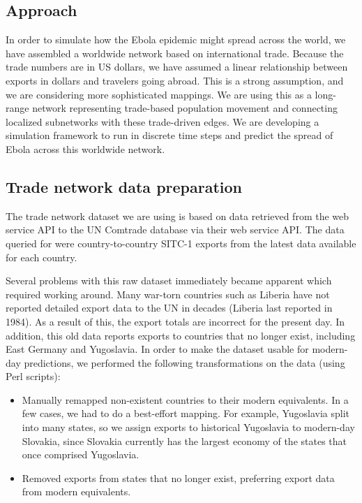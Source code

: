 \documentclass[10pt, journal,onecolumn]{IEEEtran}
\begin{document}
\subsection*{\textbf{Approach}}
In order to simulate how the Ebola epidemic might spread across the world, we have assembled a
worldwide network based on international trade. Because the trade numbers are in US dollars,
we have assumed a linear relationship between exports in dollars and travelers going abroad.
This is a strong assumption, and we are considering more sophisticated mappings.
We are using this as a long-range network representing trade-based population movement and
connecting localized subnetworks with these trade-driven edges. We are developing a simulation
framework to run in discrete time steps and predict the spread of Ebola across this worldwide network.

\subsection*{\textbf{Trade network data preparation}}

The trade network dataset we are using is based on data retrieved from the web service API to the
UN Comtrade database \citep{uncomtradedata} via their web service API.
The data queried for were country-to-country SITC-1 exports from the latest data available
for each country.

Several problems with this raw dataset immediately became apparent which required working around.
Many war-torn countries such as Liberia have not reported detailed export data
to the UN in decades (Liberia last reported in 1984). As a result of this, the export totals
are incorrect for the present day. In addition, this old data reports exports to countries that
no longer exist, including East Germany and Yugoslavia. In order to make the dataset usable for
modern-day predictions, we performed the following transformations on the data (using Perl scripts):

\begin{itemize}
\item Manually remapped non-existent countries to their modern equivalents.
      In a few cases, we had to do a best-effort mapping. For example, Yugoslavia split into many
      states, so we assign exports to historical Yugoslavia to modern-day Slovakia,
      since Slovakia currently has the largest economy of the states that once comprised Yugoslavia.
\item Removed exports from states that no longer exist, preferring export data from
      modern equivalents.
\end{itemize}
\end{document}
